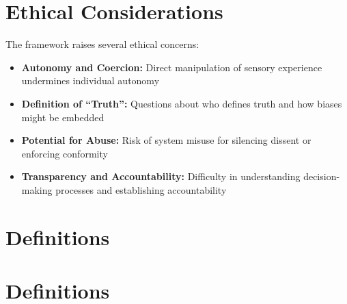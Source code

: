 \documentclass[12pt, a4paper]{article}
\begin{document}
\section{Ethical Considerations}

The framework raises several ethical concerns:

\begin{itemize}
    \item \textbf{Autonomy and Coercion:} Direct manipulation of sensory experience undermines individual autonomy
    \item \textbf{Definition of ``Truth'':} Questions about who defines truth and how biases might be embedded
    \item \textbf{Potential for Abuse:} Risk of system misuse for silencing dissent or enforcing conformity
    \item \textbf{Transparency and Accountability:} Difficulty in understanding decision-making processes and establishing accountability
\end{itemize}

\section{Definitions}

\section{Definitions}
\end{document}

